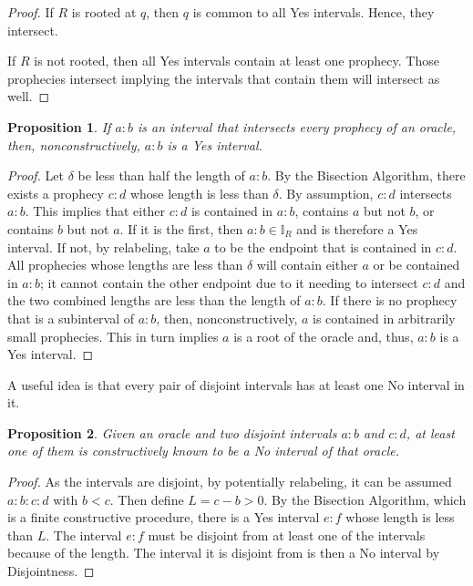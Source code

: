 \documentclass[12pt]{article}
\newtheorem{proposition}{Proposition}[section]
\begin{document}
\begin{proof}
    If $R$ is rooted at $q$, then $q$ is common to all Yes intervals. Hence, they intersect. 

    If $R$ is not rooted, then all Yes intervals contain at least one prophecy. Those prophecies intersect implying the intervals that contain them will intersect as well. 
\end{proof}


\begin{proposition}\label{os:inter}
    If $a:b$ is an interval that intersects every prophecy of an oracle, then, nonconstructively, $a:b$ is a Yes interval. 
\end{proposition}

\begin{proof}
    Let $\delta$ be less than half the length of $a:b$. By the Bisection Algorithm, there exists a prophecy $c:d$ whose length is less than $\delta$. By assumption, $c:d$ intersects $a:b$. This implies that either $c:d$ is contained in $a:b$, contains $a$ but not $b$, or contains $b$ but not $a$. If it is the first, then $a:b \in \mathbb{I}_R$ and is therefore a Yes interval. If not, by relabeling, take $a$ to be the endpoint that is contained in $c:d$. All prophecies whose lengths are less than $\delta$ will contain either $a$ or be contained in $a:b$; it cannot contain the other endpoint due to it needing to intersect $c:d$ and the two combined lengths are less than the length of $a:b$. If there is no prophecy that is a subinterval of $a:b$, then, nonconstructively, $a$ is contained in arbitrarily small prophecies. This in turn implies $a$ is a root of the oracle and, thus, $a:b$ is a Yes interval. 
\end{proof}

A useful idea is that every pair of disjoint intervals has at least one No interval in it. 

\begin{proposition}
    Given an oracle and two disjoint intervals $a:b$ and $c:d$, at least one of them is constructively known to be a No interval of that oracle. 
\end{proposition}

\begin{proof}
    As the intervals are disjoint, by potentially relabeling, it can be assumed $a:b:c:d$ with $b < c$. Then define $L = c-b > 0$. By the Bisection Algorithm, which is a finite constructive procedure, there is a Yes interval $e:f$ whose length is less than $L$. The interval $e:f$ must be disjoint from at least one of the intervals because of the length. The interval it is disjoint from is then a No interval by Disjointness. 
\end{proof}
\end{document}
